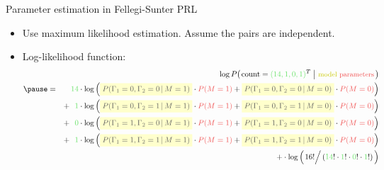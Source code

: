 \begin{frame}{\vskip -0.3cm \Large Parameter estimation in Fellegi-Sunter PRL}
\footnotesize
\begin{itemize}
\pause\item
	Use maximum likelihood estimation.\;\;
	Assume the pairs are independent.
	\vskip 0.3cm
\pause\item
	Log-likelihood function:
	{\tiny\color{mediumLightGray}
	\begin{eqnarray*}
	&& \log P\!\left(
		\left.
		\textnormal{count} = {\color{veryDarkGreen}(14 ,1 , 0 ,1)}^{T}
		\;\right\vert\,
		\textnormal{\small\color{darkYellow}model \color{customRed}parameters}
		\,\right)
	\\
	\pause
	&=&
		{\color{white}+}\,
		{\color{veryDarkGreen}14} \cdot
			\log\left(
				\colorbox{lightYellow}{\color{darkGray}$P(\Gamma_{1}=0,\Gamma_{2}=0\,\vert\,M=1)$} \cdot {\color{customRed}P(M=1)}
				\overset{{\color{white}.}}{+}
				\colorbox{lightYellow}{\color{darkGray}$P(\Gamma_{1}=0,\Gamma_{2}=0\,\vert\,M=0)$} \cdot {\color{customRed}P(M=0)}
				\right)
	\\
	&&
		+ \, {\color{veryDarkGreen}{\color{white}4}1} \cdot
			\log\left(
				\colorbox{lightYellow}{\color{darkGray}$P(\Gamma_{1}=0,\Gamma_{2}=1\,\vert\,M=1)$} \cdot {\color{customRed}P(M=1)}
				\overset{{\color{white}.}}{+}
				\colorbox{lightYellow}{\color{darkGray}$P(\Gamma_{1}=0,\Gamma_{2}=1\,\vert\,M=0)$} \cdot {\color{customRed}P(M=0)}
				\right)
	\\
	&&
		+ \, {\color{veryDarkGreen}{\color{white}4}0} \cdot
			\log\left(
				\colorbox{lightYellow}{\color{darkGray}$P(\Gamma_{1}=1,\Gamma_{2}=0\,\vert\,M=1)$} \cdot {\color{customRed}P(M=1)}
				\overset{{\color{white}.}}{+}
				\colorbox{lightYellow}{\color{darkGray}$P(\Gamma_{1}=1,\Gamma_{2}=0\,\vert\,M=0)$} \cdot {\color{customRed}P(M=0)}
				\right)
	\\
	&&
		+ \, {\color{veryDarkGreen}{\color{white}4}1} \cdot
			\log\left(
				\colorbox{lightYellow}{\color{darkGray}$P(\Gamma_{1}=1,\Gamma_{2}=1\,\vert\,M=1)$} \cdot {\color{customRed}P(M=1)}
				\overset{{\color{white}.}}{+}
				\colorbox{lightYellow}{\color{darkGray}$P(\Gamma_{1}=1,\Gamma_{2}=1\,\vert\,M=0)$} \cdot {\color{customRed}P(M=0)}
				\right)
	\\
	&&
		+ \cdot \log\left( \left.\overset{{\color{white}.}}{16!} \right/
		({\color{veryDarkGreen}14}! \cdot {\color{veryDarkGreen}1}! \cdot {\color{veryDarkGreen}0}! \cdot {\color{veryDarkGreen}1}!)\,\right)
	\end{eqnarray*}
	}
\end{itemize}

\end{frame}
\normalsize

